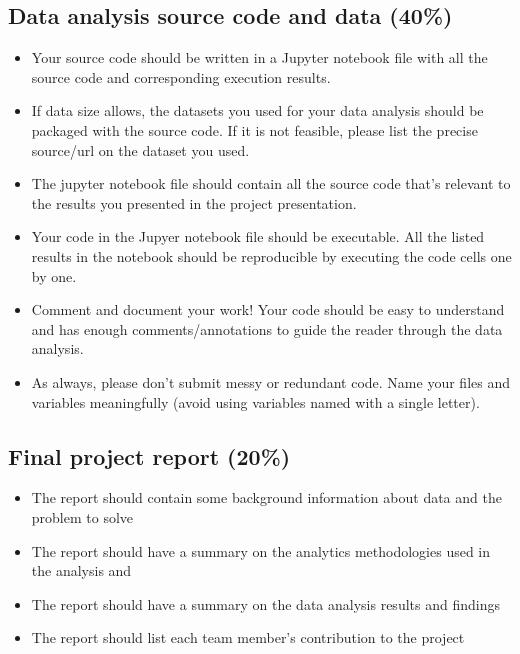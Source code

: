 \documentclass[11pt]{article}
\begin{document}
\subsection{Data analysis source code and data (40\%)}
\begin{itemize}
	\item Your source code should be written in a Jupyter notebook file with all the source code and corresponding execution results.	
	\item If data size allows, the datasets you used for your data analysis should be packaged with the source code. If it is not feasible, please list the precise source/url on the dataset you used.
	\item The jupyter notebook file should contain all the source code that's relevant to the results you presented in the project presentation.
	\item Your code in the Jupyer notebook file should be executable. All the listed results in the notebook should be reproducible by executing the code cells one by one.
	\item Comment and document your work! Your code should be easy to understand and has enough comments/annotations to guide the reader through the data analysis. 
	\item As always, please don’t submit messy or redundant code. Name your files and variables meaningfully (avoid using variables named with a single letter).
	
\end{itemize}	

\subsection{Final project report (20\%)}
\begin{itemize}
	\item The report should contain some background information about data and the problem to solve
	\item The report should have a summary on the analytics methodologies used in the analysis and
	\item The report should have a summary on the data analysis results and findings
	\item The report should list each team member's contribution to the project
\end{itemize}
\end{document}
